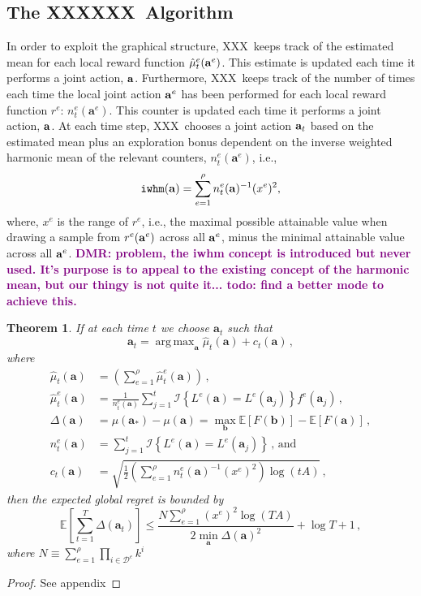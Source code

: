\documentclass{article}
\DeclareMathOperator*{\argmax}{arg\,max}
\newcommand{\est}{\hat{\mu}}
\newcommand{\ind}[1]{\mathcal{I}\!\left\{#1\right\}}
\newcommand{\algname}{XXXXXX\ }
\newcommand{\algab}{XXX\ }
\newtheorem{theorem}{Theorem}
\newcommand{\dmr}[1]{\textcolor{purple}{\bf DMR: #1}}
\begin{document}
\subsection{The \algname Algorithm}\label{sec:mainalg}
In order to exploit the graphical structure, \algab keeps track of the estimated mean for each local reward function $\est_t^e({\bf a}^e)$. This estimate is updated each time it performs a joint action, $\bf a$. Furthermore, \algab keeps track of the number of times each time the local joint action ${\bf a}^e$ has been performed for each local reward function $r^e$: $n_t^e(\mathbf{a}^e)$.  This counter is updated each time it performs a joint action, $\bf a$. At each time step, \algab chooses a joint action ${\bf a}_t$ based on the estimated mean plus an exploration bonus dependent on the inverse weighted harmonic mean of the relevant counters, $n_t^e(\mathbf{a}^e)$, i.e., 
\begin{equation}\label{eq:weightedhmean}
{\tt iwhm}({\bf a}) = \sum_{e=1}^\rho n^e_t(\mathbf{a})^{-1} (x^e)^2,
\end{equation}
where, $x^e$ is the range of $r^e$, i.e., the maximal possible attainable value when drawing a sample from $r^e({\bf a}^e)$ across all ${\bf a}^e$, minus the minimal attainable value across all ${\bf a}^e$.  \dmr{problem, the iwhm concept is introduced but never used. It's purpose is to appeal to the existing concept of the harmonic mean, but our thingy is not quite it... todo: find a better mode to achieve this.}

\begin{theorem}\label{th:main}
If at each time $t$ we choose $\mathbf{a}_t$ such that
\begin{equation}\label{eq:selectact}
\mathbf{a}_t = \argmax_\mathbf{a} \est_t(\mathbf{a}) + c_t(\mathbf{a}) \,,
\end{equation}
where
\begin{align*}
\est_t(\mathbf{a})
& = \left( \sum_{e=1}^\rho \est^e_t(\mathbf{a}) \right) \,, \\
\est^e_t(\mathbf{a})
& = \frac{1}{n^e_t(\mathbf{a})} \sum_{j=1}^t \ind{ L^e(\mathbf{a}) = L^e(\mathbf{a}_j) } f^e(\mathbf{a}_j) \,,\\
\Delta(\mathbf{a})
& = \mu(\mathbf{a}_*) - \mu(\mathbf{a}) = \max_{\mathbf{b}} \mathbb{E}[F(\mathbf{b})] - \mathbb{E}[F(\mathbf{a})]  \,,\\
n^e_t(\mathbf{a})
& = \sum_{j=1}^t \ind{ L^e(\mathbf{a}) = L^e(\mathbf{a}_j) } \,\text{, and} \\
c_t(\mathbf{a})
& = \sqrt{ \frac{1}{2} \left(\sum_{e=1}^\rho n^e_t(\mathbf{a})^{-1} (x^e)^2 \right) \log ( t A )} \,,
\end{align*}
then the expected global regret is bounded by
\[
\mathbb{E} \left[ \sum_{t=1}^T \Delta(\mathbf{a}_t) \right] \le\frac{N \sum_{e=1}^\rho (x^e)^2 \log ( T A )}{2 \min_\mathbf{a} \Delta(\mathbf{a})^2} + \log T + 1 \,,
\]
where $N \equiv \sum_{e=1}^\rho \prod_{i \in \mathcal{D}^e} k^i$
\end{theorem}
\begin{proof}
See appendix
\end{proof}
\end{document}
